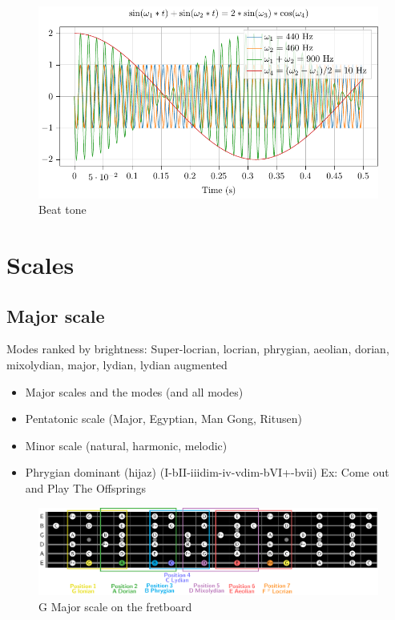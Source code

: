 \documentclass{article}
\begin{document}
\begin{figure}[h!]
	\centering
	\hspace*{0cm}
	\includegraphics[scale=0.5, trim= {0cm 0cm 0cm 0cm}, clip]{battement/main.pdf}
	\caption{Beat tone}
	\label{fig}
\end{figure}


\newpage
\section{Scales}



\newpage
\subsection{Major scale}
Modes ranked by brightness: Super-locrian, locrian, phrygian, aeolian, dorian, mixolydian, major, lydian, lydian augmented

\begin{itemize}
	\item Major scales and the modes (and all modes)
	\item Pentatonic scale (Major, Egyptian, Man Gong, Ritusen)
	\item Minor scale (natural, harmonic, melodic)
	\item Phrygian dominant (hijaz) (I-bII-iiidim-iv-vdim-bVI+-bvii)  Ex: Come out and Play The Offsprings
\end{itemize}

\begin{figure}[h!]
	\centering
	\hspace*{-2cm}
	\includegraphics[scale=0.55, trim= {0cm 0cm 0cm 0cm}, clip]{gamme_majeure_manche/main.pdf}
	\caption{G Major scale on the fretboard}
	\label{fig:gamme_majeure_manche}
\end{figure}
\end{document}
